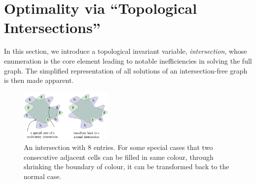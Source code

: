 \documentclass[conference]{IEEEtran}
\begin{document}
\section{Optimality via ``Topological Intersections''}
\label{section_intersection}
In this section, we introduce a topological invariant variable, \textit{intersection}, whose enumeration is the core element leading to notable inefficiencies in solving the full graph. The simplified representation of all solutions of an intersection-free graph is then made apparent.  


\begin{figure}[t]
\centering
\includegraphics[width = 0.4\textwidth]{figures/multi_entry}
\caption{An intersection with $8$ entries. For some special cases that two consecutive adjacent cells can be filled in same colour, through shrinking the boundary of colour, it can be transformed back to the normal case. }\label{fig:multi_entry}
\end{figure}
\end{document}
